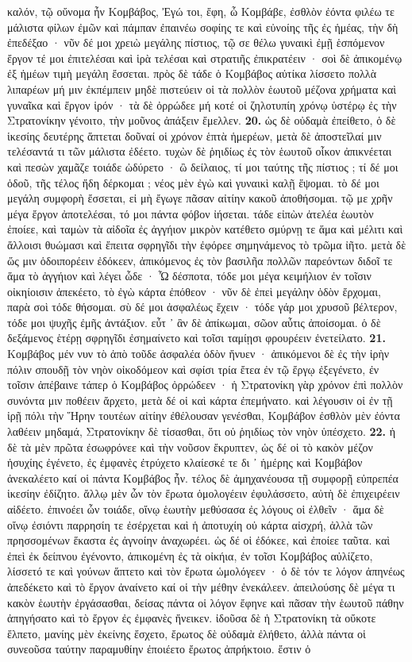 \documentclass[a4paper, 11pt, oneside, polutonikogreek, german]{article}
\begin{document}
καλόν, τῷ οὔνομα ἦν Κομβάβος, Ἐγώ τοι, ἔφη, ὦ Κομβάβε, ἐσθλὸν ἐόντα φιλέω τε μάλιστα φίλων ἐμῶν καὶ πάμπαν ἐπαινέω σοφίης τε καὶ εὐνοίης τῆς ἐς ἡμέας, τὴν δὴ ἐπεδέξαο · νῦν δέ μοι χρειὼ μεγάλης πίστιος, τῷ σε θέλω γυναικὶ ἐμῇ ἑσπόμενον ἔργον τέ μοι ἐπιτελέσαι καὶ ἱρὰ τελέσαι καὶ στρατιῆς ἐπικρατέειν · σοὶ δὲ ἀπικομένῳ ἐξ ἡμέων τιμὴ μεγάλη ἔσσεται. πρὸς δὲ τάδε ὁ Κομβάβος αὐτίκα λίσσετο πολλὰ λιπαρέων μή μιν ἐκπέμπειν μηδὲ πιστεύειν οἱ τὰ πολλὸν ἑωυτοῦ μέζονα χρήματα καὶ γυναῖκα καὶ ἔργον ἱρόν · τὰ δὲ ὀρρώδεε μή κοτέ οἱ ζηλοτυπίη χρόνῳ ὑστέρῳ ἐς τὴν Στρατονίκην γένοιτο, τὴν μοῦνος ἀπάξειν ἔμελλεν. \textbf{20.} ὡς δὲ οὐδαμὰ ἐπείθετο, ὁ δὲ ἱκεσίης δευτέρης ἅπτεται δοῦναί οἱ χρόνον ἑπτὰ ἡμερέων, μετὰ δὲ ἀποστεῖλαί μιν τελέσαντά τι τῶν μάλιστα ἐδέετο. τυχὼν δὲ ῥηιδίως ἐς τὸν ἑωυτοῦ οἶκον ἀπικνέεται καὶ πεσὼν χαμᾶζε τοιάδε ὠδύρετο · ὢ δείλαιος, τί μοι ταύτης τῆς πίστιος ; τί δέ μοι ὁδοῦ, τῆς τέλος ἤδη δέρκομαι ; νέος μὲν ἐγὼ καὶ γυναικὶ καλῇ ἕψομαι. τὸ δέ μοι μεγάλη συμφορὴ ἔσσεται, εἰ μὴ ἔγωγε πᾶσαν αἰτίην κακοῦ ἀποθήσομαι. τῷ με χρῆν μέγα ἔργον ἀποτελέσαι, τό μοι πάντα φόβον ἰήσεται. τάδε εἰπὼν ἀτελέα ἑωυτὸν ἐποίεε, καὶ ταμὼν τὰ αἰδοῖα ἐς ἀγγήιον μικρὸν κατέθετο σμύρνῃ τε ἅμα καὶ μέλιτι καὶ ἄλλοισι θυώμασι καὶ ἔπειτα σφρηγῖδι τὴν ἐφόρεε σημηνάμενος τὸ τρῶμα ἰῆτο. μετὰ δὲ ὥς μιν ὁδοιπορέειν ἐδόκεεν, ἀπικόμενος ἐς τὸν βασιλῆα πολλῶν παρεόντων διδοῖ τε ἅμα τὸ ἀγγήιον καὶ λέγει ὧδε · Ὦ δέσποτα, τόδε μοι μέγα κειμήλιον ἐν τοῖσιν οἰκηίοισιν ἀπεκέετο, τὸ ἐγὼ κάρτα ἐπόθεον · νῦν δὲ ἐπεὶ μεγάλην ὁδὸν ἔρχομαι, παρὰ σοὶ τόδε θήσομαι. σὺ δέ μοι ἀσφαλέως ἔχειν · τόδε γάρ μοι χρυσοῦ βέλτερον, τόδε μοι ψυχῆς ἐμῆς ἀντάξιον. εὖτ ᾽ ἂν δὲ ἀπίκωμαι, σῶον αὖτις ἀποίσομαι. ὁ δὲ δεξάμενος ἑτέρῃ σφρηγῖδι ἐσημαίνετο καὶ τοῖσι ταμίῃσι φρουρέειν ἐνετείλατο. \textbf{21.} Κομβάβος μέν νυν τὸ ἀπὸ τοῦδε ἀσφαλέα ὁδὸν ἤνυεν · ἀπικόμενοι δὲ ἐς τὴν ἱρὴν πόλιν σπουδῇ τὸν νηὸν οἰκοδόμεον καὶ σφίσι τρία ἔτεα ἐν τῷ ἔργῳ ἐξεγένετο, ἐν τοῖσιν ἀπέβαινε τάπερ ὁ Κομβάβος ὀρρώδεεν · ἡ Στρατονίκη γὰρ χρόνον ἐπὶ πολλὸν συνόντα μιν ποθέειν ἄρχετο, μετὰ δέ οἱ καὶ κάρτα ἐπεμήνατο. καὶ λέγουσιν οἱ ἐν τῇ ἱρῇ πόλι τὴν Ἥρην τουτέων αἰτίην ἐθέλουσαν γενέσθαι, Κομβάβον ἐσθλὸν μὲν ἐόντα λαθέειν μηδαμά, Στρατονίκην δὲ τίσασθαι, ὅτι οὐ ῥηιδίως τὸν νηὸν ὑπέσχετο. \textbf{22.} ἡ δὲ τὰ μὲν πρῶτα ἐσωφρόνεε καὶ τὴν νοῦσον ἔκρυπτεν, ὡς δέ οἱ τὸ κακὸν μέζον ἡσυχίης ἐγένετο, ἐς ἐμφανὲς ἐτρύχετο κλαίεσκέ τε δι ᾽ ἡμέρης καὶ Κομβάβον ἀνεκαλέετο καί οἱ πάντα Κομβάβος ἦν. τέλος δὲ ἀμηχανέουσα τῇ συμφορῇ εὐπρεπέα ἱκεσίην ἐδίζητο. ἄλλῳ μὲν ὦν τὸν ἔρωτα ὁμολογέειν ἐφυλάσσετο, αὐτὴ δὲ ἐπιχειρέειν αἰδέετο. ἐπινοέει ὦν τοιάδε, οἴνῳ ἑωυτὴν μεθύσασα ἐς λόγους οἱ ἐλθεῖν · ἅμα δὲ οἴνῳ ἐσιόντι παρρησίη τε ἐσέρχεται καὶ ἡ ἀποτυχίη οὐ κάρτα αἰσχρή, ἀλλὰ τῶν πρησσομένων ἕκαστα ἐς ἀγνοίην ἀναχωρέει. ὡς δέ οἱ ἐδόκεε, καὶ ἐποίεε ταῦτα. καὶ ἐπεὶ ἐκ δείπνου ἐγένοντο, ἀπικομένη ἐς τὰ οἰκήια, ἐν τοῖσι Κομβάβος αὐλίζετο, λίσσετό τε καὶ γούνων ἅπτετο καὶ τὸν ἔρωτα ὡμολόγεεν · ὁ δὲ τόν τε λόγον ἀπηνέως ἀπεδέκετο καὶ τὸ ἔργον ἀναίνετο καί οἱ τὴν μέθην ἐνεκάλεεν. ἀπειλούσης δὲ μέγα τι κακὸν ἑωυτὴν ἐργάσασθαι, δείσας πάντα οἱ λόγον ἔφηνε καὶ πᾶσαν τὴν ἑωυτοῦ πάθην ἀπηγήσατο καὶ τὸ ἔργον ἐς ἐμφανὲς ἤνεικεν. ἰδοῦσα δὲ ἡ Στρατονίκη τὰ οὔκοτε ἔλπετο, μανίης μὲν ἐκείνης ἔσχετο, ἔρωτος δὲ οὐδαμὰ ἐλήθετο, ἀλλὰ πάντα οἱ συνεοῦσα ταύτην παραμυθίην ἐποιέετο ἔρωτος ἀπρήκτοιο. ἔστιν ὁ 
\end{document}
